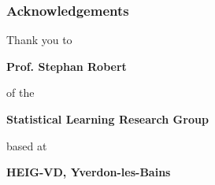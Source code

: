 \documentclass[
	11pt, %
]{beamer}
\begin{document}
%
%
%
%
%
%	
%	
%	
%
%
%	
%		
%			


\begin{frame}
	\frametitle{Acknowledgements}
	
\begin{center}
	Thank you to
	
	\textbf{Prof. Stephan Robert}
	
	of the 
	
	\textbf{Statistical Learning Research Group}
	
	based at
	
	\textbf{HEIG-VD, Yverdon-les-Bains}
\end{center}
\end{frame}
\end{document}
